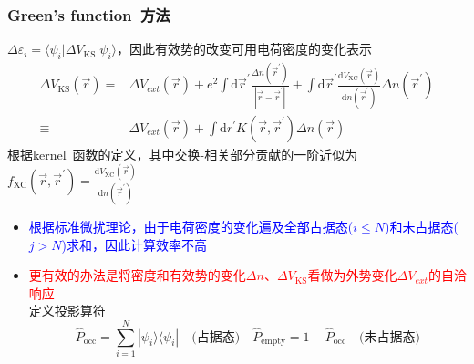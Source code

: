\documentclass[cjk,slidestop,compress,mathserif,blue]{beamer}
\begin{document}
\frame
{
	\frametitle{\textrm{Green's function~}方法}
	$\Delta\varepsilon_i=\langle\psi_i|\Delta V_{\mathrm{KS}}|\psi_i\rangle$，因此有效势的改变可用电荷密度的变化表示
	\begin{displaymath}
		\begin{aligned}
			\Delta V_{\mathrm{KS}}(\vec r)=&\Delta V_{ext}(\vec r)+e^2\int\mathrm{d}\vec r^{\prime}\frac{\Delta n(\vec r^{\prime})}{|\vec r-\vec r^{\prime}|}+\int\mathrm{d}\vec r^{\prime}\frac{\mathrm{d}V_{\mathrm{XC}}(\vec r)}{\mathrm{d}n(\vec r^{\prime})}\Delta n(\vec r^{\prime})\\
			\equiv&\Delta V_{ext}(\vec r)+\int\mathrm{d}r^{\prime}K(\vec r,\vec r^{\prime})\Delta n(\vec r)
		\end{aligned}
	\end{displaymath}
	根据\textrm{kernel~}函数的定义，其中交换-相关部分贡献的一阶近似为$f_{\mathrm{XC}}(\vec r,\vec r^{\prime})=\tfrac{\mathrm{d}V_{\mathrm{XC}}(\vec r)}{\mathrm{d}n(\vec r^{\prime})}$
	\begin{itemize}
		\item \textcolor{blue}{根据标准微扰理论，由于电荷密度的变化遍及全部占据态($i\leqslant N$)和未占据态($j>N$)求和，因此计算效率不高}
		\item \textcolor{red}{更有效的办法是将密度和有效势的变化$\Delta n$、$\Delta V_{\mathrm{KS}}$看做为外势变化$\Delta V_{ext}$的自洽响应}\\
定义投影算符
\begin{displaymath}
		\hat P_{\mathrm{occ}}=\sum_{i=1}^N|\psi_i\rangle\langle\psi_i|\quad\mbox{(占据态)}\quad%
		\hat P_{\mathrm{empty}}=1-\hat P_{\mathrm{occ}}\quad\mbox{(未占据态)}
\end{displaymath}
	\end{itemize}
}
\end{document}
